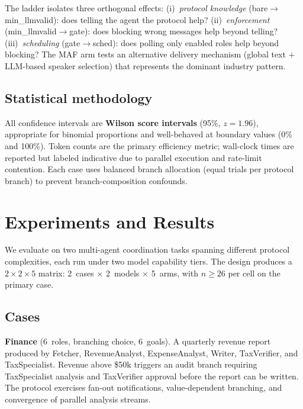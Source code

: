 The ladder isolates three orthogonal effects:
(i)~\emph{protocol knowledge} (bare$\to$min\_llmvalid): does telling the
agent the protocol help?
(ii)~\emph{enforcement} (min\_llmvalid$\to$gate): does blocking wrong
messages help beyond telling?
(iii)~\emph{scheduling} (gate$\to$sched): does polling only enabled roles
help beyond blocking?
The MAF arm tests an alternative delivery mechanism (global text +
LLM-based speaker selection) that represents the dominant industry
pattern.

\subsection{Statistical methodology}

All confidence intervals are \textbf{Wilson score intervals} (95\%,
$z = 1.96$), appropriate for binomial proportions and well-behaved at
boundary values (0\% and 100\%).
Token counts are the primary efficiency metric; wall-clock times are
reported but labeled indicative due to parallel execution and rate-limit
contention.
Each case uses balanced branch allocation (equal trials per protocol
branch) to prevent branch-composition confounds.


\section{Experiments and Results}\label{sec:results}

We evaluate \stjp{} on two multi-agent coordination tasks spanning
different protocol complexities, each run under two model capability
tiers.
The design produces a $2 \times 2 \times 5$ matrix:
2~cases $\times$ 2~models $\times$ 5~arms, with $n \geq 26$ per cell
on the primary case.

\subsection{Cases}

\textbf{Finance} (6~roles, branching choice, 6~goals).
A quarterly revenue report produced by Fetcher, RevenueAnalyst,
ExpenseAnalyst, Writer, TaxVerifier, and TaxSpecialist.
Revenue above \$50k triggers an audit branch requiring TaxSpecialist
analysis and TaxVerifier approval before the report can be written.
The protocol exercises fan-out notifications, value-dependent branching,
and convergence of parallel analysis streams.

